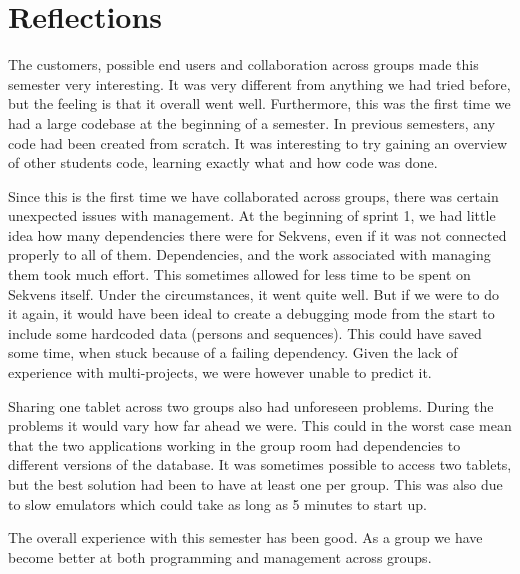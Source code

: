 \section{Reflections}\label{sec:reflections}

The customers, possible end users and collaboration across groups made this semester very interesting. It was very different from anything we had tried before, but the feeling is that it overall went well. Furthermore, this was the first time we had a large codebase at the beginning of a semester. In previous semesters, any code had been created from scratch. It was interesting to try gaining an overview of other students code, learning exactly what and how code was done.

Since this is the first time we have collaborated across groups, there was certain unexpected issues with management. At the beginning of sprint 1, we had little idea how many dependencies there were for Sekvens, even if it was not connected properly to all of them. Dependencies, and the work associated with managing them took much effort. This sometimes allowed for less time to be spent on Sekvens itself. Under the circumstances, it went quite well. But if we were to do it again, it would have been ideal to create a debugging mode from the start to include some hardcoded data (persons and sequences). This could have saved some time, when stuck because of a failing dependency. Given the lack of experience with multi-projects, we were however unable to predict it.

Sharing one tablet across two groups also had unforeseen problems. During the problems it would vary how far ahead we were. This could in the worst case mean that the two applications working in the group room had dependencies to different versions of the database. It was sometimes possible to access two tablets, but the best solution had been to have at least one per group. This was also due to slow emulators which could take as long as 5 minutes to start up.

The overall experience with this semester has been good. As a group we have become better at both programming and management across groups.